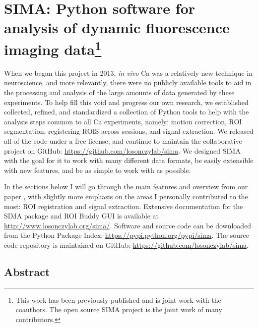 \chapter[SIMA Analysis Software]{SIMA: Python software for analysis of dynamic fluorescence imaging data\footnote{This work has been previously published \citep{Kaifosh2014} and is joint work with the coauthors. The open source SIMA project is the joint work of many contributors.}}
\label{ch:sima}

When we began this project in 2013, \emph{in vivo} Ca was a relatively new technique in neuroscience, and more relevantly, there were no publicly available tools to aid in the processing and analysis of the large amounts of data generated by these experiments.
To help fill this void and progress our own research, we established collected, refined, and standardized a collection of Python tools to help with the analysis steps common to all Ca experiments, namely: motion correction, ROI segmentation, registering ROIS across sessions, and signal extraction.
We released all of the code under a free license, and continue to maintain the collaborative project on GitHub: \url{https://github.com/losonczylab/sima}. 
We designed SIMA with the goal for it to work with many different data formats, be easily extensible with new features, and be as simple to work with as possible.

In the sections below I will go through the main features and overview from our paper \citep{Kaifosh2014}, with slightly more emphasis on the areas I personally contributed to the most: ROI registration and signal extraction.
Extensive documentation for the SIMA package and ROI Buddy GUI
is available at \url{http://www.losonczylab.org/sima/}.
Software and source code can be downloaded from the Python Package Index: 
\url{https://pypi.python.org/pypi/sima}.
The source code repository is maintained on GitHub:
\url{https://github.com/losonczylab/sima}.

\section{Abstract}

